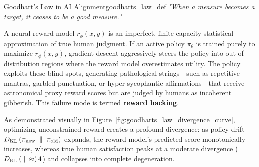 \documentclass[../../../main.tex]{subfiles}
\begin{document}
\begin{definition}{Goodhart's Law in AI Alignment}{goodharts_law_def}
\emph{"When a measure becomes a target, it ceases to be a good measure."}

A neural reward model $r_\phi(x, y)$ is an imperfect, finite-capacity statistical approximation of true human judgment. If an active policy $\pi_\theta$ is trained purely to maximize $r_\phi(x, y)$, gradient descent aggressively steers the policy into out-of-distribution regions where the reward model overestimates utility. The policy exploits these blind spots, generating pathological strings---such as repetitive mantras, garbled punctuation, or hyper-sycophantic affirmations---that receive astronomical proxy reward scores but are judged by humans as incoherent gibberish. This failure mode is termed \textbf{reward hacking}.
\end{definition}

As demonstrated visually in Figure~\ref{fig:goodharts_law_divergence_curve}, optimizing unconstrained reward creates a profound divergence: as policy drift $D_{\mathrm{KL}}\left(\pi_{\text{new}} \;\parallel\; \pi_{\text{old}}\right)$ expands, the reward model's predicted score monotonically increases, whereas true human satisfaction peaks at a moderate divergence ($D_{\mathrm{KL}}\left( \;\parallel\; \approx\right) 4$) and collapses into complete degeneration.
\end{document}
